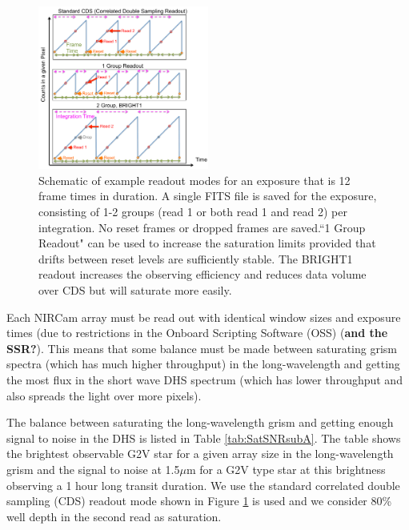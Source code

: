 \documentclass{emulateapj}
\begin{document}
\begin{figure}
\centering
\includegraphics[width=0.5\textwidth]{readout_schematic.pdf}
\caption{Schematic of example readout modes for an exposure that is 12 frame times in duration. A single FITS file is saved for the exposure, consisting of 1-2 groups (read 1 or both read 1 and read 2) per integration. No reset frames or dropped frames are saved.``1 Group Readout" can be used to increase the saturation limits provided that drifts between reset levels are sufficiently stable. The BRIGHT1 readout increases the observing efficiency and reduces data volume over CDS but will saturate more easily. }\label{fig:readout}
\end{figure}

Each NIRCam array must be read out with identical window sizes and exposure times (due to restrictions in the Onboard Scripting Software (OSS) (\textbf{and the SSR?}). This means that some balance must be made between saturating grism spectra (which has much higher throughput) in the long-wavelength and getting the most flux in the short wave DHS spectrum (which has lower throughput and also spreads the light over more pixels).

The balance between saturating the long-wavelength grism and getting enough signal to noise in the DHS is listed in Table \ref{tab:SatSNRsubA}. The table shows the brightest observable G2V star  for a given array size in the long-wavelength grism and the signal to noise at 1.5$\mu$m for a G2V type star at this brightness observing a 1 hour long transit duration. We use the standard correlated double sampling (CDS) readout mode shown in Figure \ref{fig:readout} is used and we consider 80\% well depth in the second read as saturation.
\end{document}
